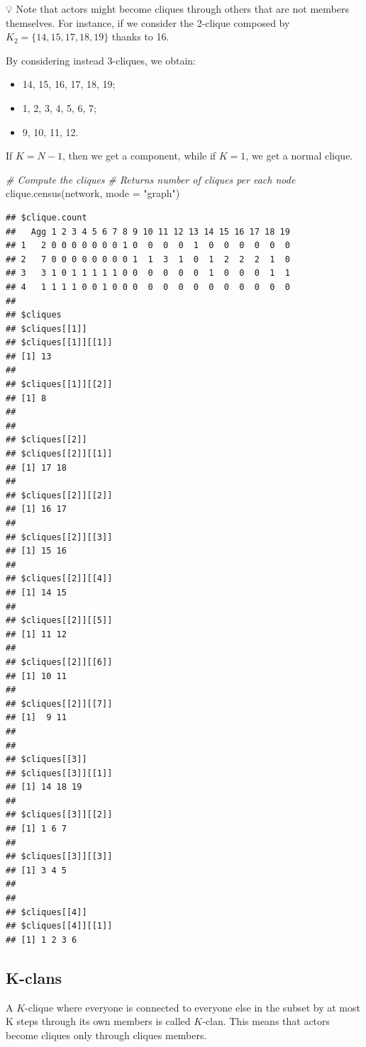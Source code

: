 \documentclass[
  notitlepage,
  onecolumn,
  openany]{book}
\newenvironment{Shaded}{\begin{snugshade}}{\end{snugshade}}
\newcommand{\AttributeTok}[1]{\textcolor[rgb]{0.77,0.63,0.00}{#1}}
\newcommand{\CommentTok}[1]{\textcolor[rgb]{0.56,0.35,0.01}{\textit{#1}}}
\newcommand{\FunctionTok}[1]{\textcolor[rgb]{0.00,0.00,0.00}{#1}}
\newcommand{\NormalTok}[1]{#1}
\newcommand{\StringTok}[1]{\textcolor[rgb]{0.31,0.60,0.02}{#1}}
\providecommand{\tightlist}{%
  \setlength{\itemsep}{0pt}\setlength{\parskip}{0pt}}
\begin{document}
💡 Note that actors might become cliques through others that are not members themselves. For instance, if we consider the 2-clique composed by \(K_2 = \{14,15,17,18,19\}\) thanks to 16.

By considering instead 3-cliques, we obtain:

\begin{itemize}
\tightlist
\item
  14, 15, 16, 17, 18, 19;
\item
  1, 2, 3, 4, 5, 6, 7;
\item
  9, 10, 11, 12.
\end{itemize}

If \(K = N-1\), then we get a component, while if \(K=1\), we get a normal clique.

\begin{Shaded}
\begin{Highlighting}[]
\CommentTok{\# Compute the cliques}
\CommentTok{\# Returns number of cliques per each node}
\FunctionTok{clique.census}\NormalTok{(network, }\AttributeTok{mode =} \StringTok{"graph"}\NormalTok{)}
\end{Highlighting}
\end{Shaded}

\begin{verbatim}
## $clique.count
##   Agg 1 2 3 4 5 6 7 8 9 10 11 12 13 14 15 16 17 18 19
## 1   2 0 0 0 0 0 0 0 1 0  0  0  0  1  0  0  0  0  0  0
## 2   7 0 0 0 0 0 0 0 0 1  1  3  1  0  1  2  2  2  1  0
## 3   3 1 0 1 1 1 1 1 0 0  0  0  0  0  1  0  0  0  1  1
## 4   1 1 1 1 0 0 1 0 0 0  0  0  0  0  0  0  0  0  0  0
## 
## $cliques
## $cliques[[1]]
## $cliques[[1]][[1]]
## [1] 13
## 
## $cliques[[1]][[2]]
## [1] 8
## 
## 
## $cliques[[2]]
## $cliques[[2]][[1]]
## [1] 17 18
## 
## $cliques[[2]][[2]]
## [1] 16 17
## 
## $cliques[[2]][[3]]
## [1] 15 16
## 
## $cliques[[2]][[4]]
## [1] 14 15
## 
## $cliques[[2]][[5]]
## [1] 11 12
## 
## $cliques[[2]][[6]]
## [1] 10 11
## 
## $cliques[[2]][[7]]
## [1]  9 11
## 
## 
## $cliques[[3]]
## $cliques[[3]][[1]]
## [1] 14 18 19
## 
## $cliques[[3]][[2]]
## [1] 1 6 7
## 
## $cliques[[3]][[3]]
## [1] 3 4 5
## 
## 
## $cliques[[4]]
## $cliques[[4]][[1]]
## [1] 1 2 3 6
\end{verbatim}

\hypertarget{k-clans}{%
\subsection{K-clans}\label{k-clans}}

A \(K\)-clique where everyone is connected to everyone else in the subset by at most K steps through its own members is called \(K\)-clan. This means that actors become cliques only through cliques members.
\end{document}

